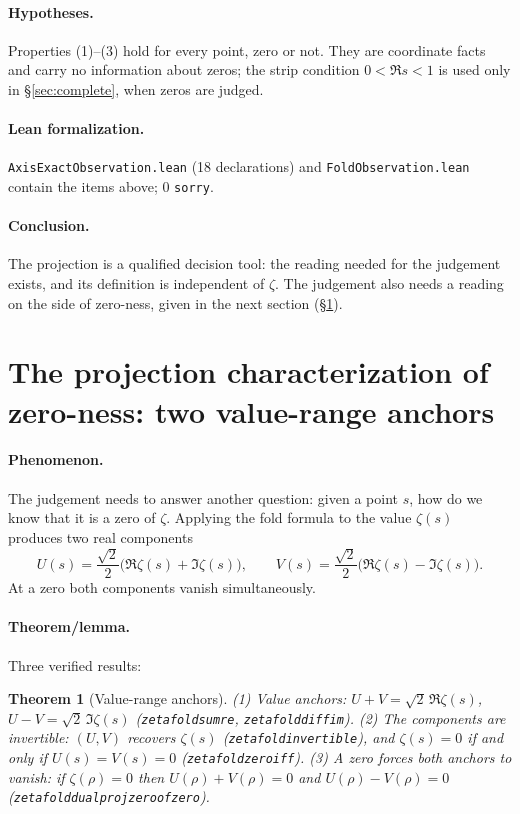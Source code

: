 \documentclass{article}
\renewcommand{\_}{\underscoreOrig\allowbreak}
\newtheorem{theorem}{Theorem}[section]
\newcommand{\zt}{\zeta}
\begin{document}
\paragraph{Hypotheses.} Properties (1)--(3) hold for every point, zero
or not. They are coordinate facts and carry no information about zeros;
the strip condition $0<\Re s<1$ is used only in \S\ref{sec:complete},
when zeros are judged.

\paragraph{Lean formalization.} \texttt{AxisExactObservation.lean}
(18 declarations) and \texttt{FoldObservation.lean} contain the items
above; 0 \texttt{sorry}.

\paragraph{Conclusion.} The projection is a qualified decision tool: the
reading needed for the judgement exists, and its definition is
independent of $\zt$. The judgement also needs a reading on the side of
zero-ness, given in the next section (\S\ref{sec:anchors}).

\section{The projection characterization of zero-ness: two value-range
anchors}
\label{sec:anchors}

\paragraph{Phenomenon.} The judgement needs to answer another question:
given a point $s$, how do we know that it is a zero of $\zt$. Applying
the fold formula to the value $\zt(s)$ produces two real components
\[
  U(s)=\frac{\sqrt2}{2}\big(\Re\zt(s)+\Im\zt(s)\big),
  \qquad
  V(s)=\frac{\sqrt2}{2}\big(\Re\zt(s)-\Im\zt(s)\big).
\]
At a zero both components vanish simultaneously.

\paragraph{Theorem/lemma.} Three verified results:
\begin{theorem}[Value-range anchors]
\label{thm:anchors}
(1) Value anchors: $U+V=\sqrt2\,\Re\zt(s)$,
$U-V=\sqrt2\,\Im\zt(s)$ (\texttt{zeta\_fold\_sum\_re},
\texttt{zeta\_fold\_diff\_im}).
(2) The components are invertible: $(U,V)$ recovers $\zt(s)$
(\texttt{zeta\_fold\_invertible}), and $\zt(s)=0$ if and only if
$U(s)=V(s)=0$ (\texttt{zeta\_fold\_zero\_iff}).
(3) A zero forces both anchors to vanish: if $\zt(\rho)=0$ then
$U(\rho)+V(\rho)=0$ and $U(\rho)-V(\rho)=0$
(\texttt{zeta\_fold\_dual\_proj\_zero\_of\_zero}).
\end{theorem}
\end{document}
